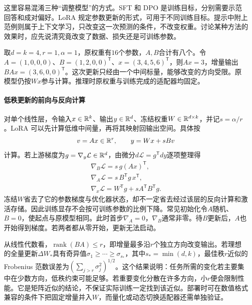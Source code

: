 这里容易混淆三种“调整模型”的方式。SFT 和 DPO 是训练目标，分别需要示范回答和成对偏好。LoRA 规定参数更新的形式，可用于不同训练目标。提示中附上范例则属于上下文学习，只改变这一次预测的条件，不改变权重。讨论某种方法的效果时，应先说清究竟改变了数据、损失还是可训练参数。

取$d=k=4,r=1,\alpha=1$，原权重有$16$个参数，$A,B$合计有八个。令$A=(1,0,0,0)$、$B=(1,2,0,0)^{\mathsf T}$、$x=(3,4,5,6)^{\mathsf T}$，则$Ax=3$，增量输出$BAx=(3,6,0,0)^{\mathsf T}$。这次更新只经由一个中间标量，能够改变的方向受限。原模型仍按$Wx$参与计算。推理时原权重与训练完成的适配器均固定。

\paragraph{低秩更新的前向与反向计算}
对单个线性层，令输入$x\in\mathbb{R}^k$、输出$y\in\mathbb{R}^d$、冻结权重$W\in\mathbb{R}^{d\times k}$，并记$s=\alpha/r$。LoRA 可以先计算低维中间量，再将其映射回输出空间。具体按
\begin{equation}
 v=Ax\in\mathbb{R}^r,\qquad y=Wx+sBv
\end{equation}
计算。若上游梯度为$g=\nabla_y\mathcal L\in\mathbb{R}^d$，由微分$d\mathcal L=g^{\mathsf T}dy$逐项整理得
\begin{gather}
 \nabla_B\mathcal L=s\,g(Ax)^{\mathsf T},\\
 \nabla_A\mathcal L=s\,B^{\mathsf T}g\,x^{\mathsf T},\\
 \nabla_x\mathcal L=W^{\mathsf T}g+sA^{\mathsf T}B^{\mathsf T}g.
\end{gather}
冻结$W$省去了它的参数梯度与优化器状态，却不一定省去经过该层的反向计算和激活存储。因此训练显存不会按可训练参数的比例下降。常见初始化令$A$随机、$B=0$，使起点与原模型相同。此时首步$\nabla_A=0$，$\nabla_B$通常非零。待$B$更新后，$A$也开始得到梯度。若两者都从零开始，更新无法启动。

从线性代数看，$\operatorname{rank}(BA)\leq r$，即增量最多沿$r$个独立方向改变输出。若理想的全量更新$\Delta W_*$具有奇异值$\sigma_1\geq\cdots\geq\sigma_{s_*}$，其中$s_*=\min(d,k)$，最佳秩$r$近似的 Frobenius 范数误差为$(\sum_{j>r}\sigma_j^2)^{1/2}$。这个结果说明：任务所需的变化若主要集中在少数方向，低秩约束可能足够。若重要变化分散在许多方向，小$r$便会限制性能。它是矩阵近似的结论，不保证实际训练一定找到该近似。部署时可在数值格式兼容的条件下把固定增量并入$W$，而量化或动态切换适配器还需单独验证。

